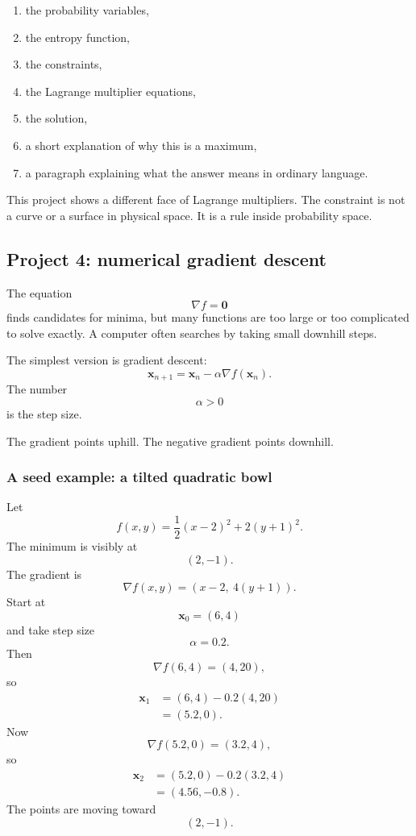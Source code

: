\begin{enumerate}
\item the probability variables,

\item the entropy function,

\item the constraints,

\item the Lagrange multiplier equations,

\item the solution,

\item a short explanation of why this is a maximum,

\item a paragraph explaining what the answer means in ordinary language.
\end{enumerate}

This project shows a different face of Lagrange multipliers.  The constraint is not a
curve or a surface in physical space.  It is a rule inside probability space.

\subsection{Project 4: numerical gradient descent}

The equation
\[
    \nabla f=\mathbf 0
\]
finds candidates for minima, but many functions are too large or too complicated to
solve exactly.  A computer often searches by taking small downhill steps.

The simplest version is gradient descent:
\[
\boxed{
    \mathbf x_{n+1}
    =
    \mathbf x_n-\alpha\nabla f(\mathbf x_n).
}
\]
The number
\[
    \alpha>0
\]
is the step size.

The gradient points uphill.  The negative gradient points downhill.

\subsubsection*{A seed example: a tilted quadratic bowl}

Let
\[
    f(x,y)=\frac12(x-2)^2+2(y+1)^2.
\]
The minimum is visibly at
\[
    (2,-1).
\]
The gradient is
\[
    \nabla f(x,y)=(x-2,\ 4(y+1)).
\]
Start at
\[
    \mathbf x_0=(6,4)
\]
and take step size
\[
    \alpha=0.2.
\]
Then
\[
    \nabla f(6,4)=(4,20),
\]
so
\[
\begin{aligned}
\mathbf x_1
&=
(6,4)-0.2(4,20)\\
&=
(5.2,0).
\end{aligned}
\]
Now
\[
    \nabla f(5.2,0)=(3.2,4),
\]
so
\[
\begin{aligned}
\mathbf x_2
&=
(5.2,0)-0.2(3.2,4)\\
&=
(4.56,-0.8).
\end{aligned}
\]
The points are moving toward
\[
    (2,-1).
\]

